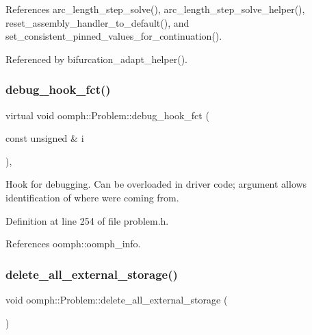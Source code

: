 References arc\+\_\+length\+\_\+step\+\_\+solve(), arc\+\_\+length\+\_\+step\+\_\+solve\+\_\+helper(), reset\+\_\+assembly\+\_\+handler\+\_\+to\+\_\+default(), and set\+\_\+consistent\+\_\+pinned\+\_\+values\+\_\+for\+\_\+continuation().



Referenced by bifurcation\+\_\+adapt\+\_\+helper().

\mbox{\label{classoomph_1_1Problem_a36c95c8211cc02558118288888aab5e1}} 
\subsubsection{\texorpdfstring{debug\+\_\+hook\+\_\+fct()}{debug\_hook\_fct()}}
{\footnotesize\ttfamily virtual void oomph\+::\+Problem\+::debug\+\_\+hook\+\_\+fct (\begin{DoxyParamCaption}\item[{const unsigned \&}]{i }\end{DoxyParamCaption})\hspace{0.3cm}{\ttfamily [inline]}, {\ttfamily [virtual]}}



Hook for debugging. Can be overloaded in driver code; argument allows identification of where we\textquotesingle{}re coming from. 



Definition at line 254 of file problem.\+h.



References oomph\+::oomph\+\_\+info.

\mbox{\label{classoomph_1_1Problem_ab8eb3782046c64ea0e46205917440452}} 
\subsubsection{\texorpdfstring{delete\+\_\+all\+\_\+external\+\_\+storage()}{delete\_all\_external\_storage()}}
{\footnotesize\ttfamily void oomph\+::\+Problem\+::delete\+\_\+all\+\_\+external\+\_\+storage (\begin{DoxyParamCaption}{ }\end{DoxyParamCaption})}



